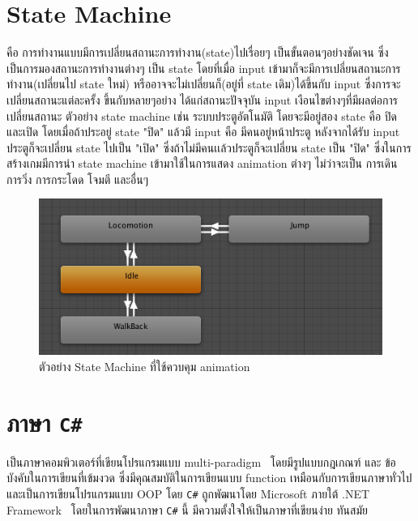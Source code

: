 \section{State Machine}
\enskip \enskip \enskip \enskip \enskip คือ การทำงานแบบมีการเปลี่ยนสถานะการทำงาน(state)ไปเรื่อยๆ เป็นขั้นตอนๆอย่างชัดเจน ซึ่งเป็นการมองสถานะการทำงานต่างๆ
เป็น state โดยที่เมื่อ input เข้ามาก็จะมีการเปลี่ยนสถานะการทำงาน(เปลี่ยนไป state ใหม่) หรืออาจจะไม่เปลี่ยนก็(อยู่ที่ state เดิม)ได้ขึ้นกับ input ซึ่งการจะเปลี่ยนสถานะแต่ละครั้ง
ขึ้นกับหลายๆอย่าง ได้แก่สถานะปัจจุบัน input เงือนไขต่างๆที่มีผลต่อการเปลี่ยนสถานะ ตัวอย่าง state machine เช่น ระบบประตูอัตโนมัติ โดยจะมีอยู่สอง state คือ ปิด และเปิด 
โดยเมื่อถ้าประอยู่ state "ปิด" แล้วมี input คือ มีคนอยู่หน้าประตู หลังจากได้รับ input ประตูก็จะเปลี่ยน state ไปเป็น "เปิด" ซึ่งถ้าไม่มีคนเเล้วประตูก็จะเปลี่ยน state เป็น "ปิด"
ซึ่งในการสร้างเกมมีการนำ state machine เข้ามาใช้ในการแสดง animation ต่างๆ ไม่ว่าจะเป็น การเดิน การวิ่ง การกระโดด โจมตี และอื่นๆ

\begin{figure}[htbp]
  \centering 
  \includegraphics[scale=0.6]{MecanimStateMachine.png}
  \caption[State Machine]{ตัวอย่าง State Machine ที่ใช้ควบคุม animation}
  \label{fig:stateMachine}
\end{figure}

\section{ภาษา \texttt{C\#}}
\enskip \enskip \enskip \enskip \enskip เป็นภาษาคอมพิวเตอร์ที่เขียนโปรแกรมแบบ multi-paradigm~\cite{multiParadigm} โดยมีรูปแบบกฎเกณฑ์ และ
ข้อบังคับในการเขียนที่เข้มงวด ซึ่งมีคุณสมบัติในการเขียนแบบ function เหมือนกับการเขียนภาษาทั่วไป และเป็นการเขียนโปรแกรมแบบ OOP โดย \texttt{C\#} ถูกพัฒนาโดย 
Microsoft ภายใต้ .NET Framework~\cite{NET_Framework} โดยในการพัฒนาภาษา \texttt{C\#} นี้ มีความตั้งใจให้เป็นภาษาที่เขียนง่าย ทันสมัย 

